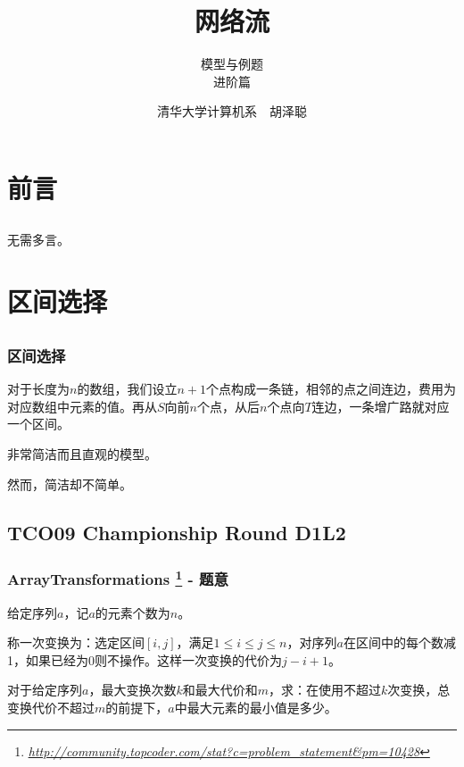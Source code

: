 \documentclass[11pt,dvipsnames,table]{beamer}
\newcommand{\hlink}[1]{
	\footnote{\fontsize{6pt}{\baselineskip}\href{#1}{\textsl{\underline{#1}}}}
}
\begin{document}
\title[网络流]{\fontsize{24pt}{\baselineskip}网络流}
\subtitle[模型与例题]{\fontsize{16pt}{\baselineskip}模型与例题\\ 进阶篇}
\author{清华大学计算机系~~胡泽聪}
\date{}

\maketitle

{\fontsize{9pt}{\baselineskip}

\section{前言}
\subsection{}
\begin{frame}
	无需多言。
\end{frame}

\section[Model VIII]{区间选择}
\subsection{}
\begin{frame}
	\frametitle{区间选择}
	对于长度为$n$的数组，我们设立$n+1$个点构成一条链，相邻的点之间连边，费用为对应数组中元素的值。再从$S$向前$n$个点，从后$n$个点向$T$连边，一条增广路就对应一个区间。
	
	非常简洁而且直观的模型。
	
	然而，简洁却不简单。
\end{frame}
\subsection{TCO09 Championship Round D1L2}
\begin{frame}
	\frametitle{ArrayTransformations\hlink{http://community.topcoder.com/stat?c=problem\_statement\&pm=10428} - 题意}
	给定序列$a$，记$a$的元素个数为$n$。
	
	称一次变换为：选定区间$[i,j]$，满足$1\leq i\leq j\leq n$，对序列$a$在区间中的每个数减1，如果已经为0则不操作。这样一次变换的代价为$j-i+1$。
	
	对于给定序列$a$，最大变换次数$k$和最大代价和$m$，求：在使用不超过$k$次变换，总变换代价不超过$m$的前提下，$a$中最大元素的最小值是多少。
	

\end{frame}}
\end{document}
